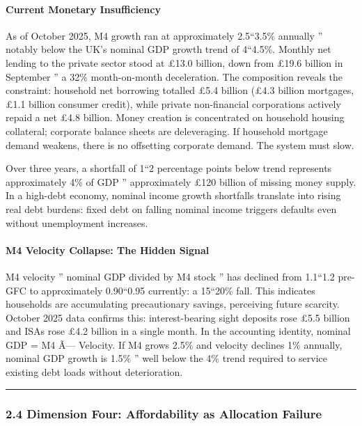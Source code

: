 \documentclass[
]{article}
\begin{document}
\paragraph{Current Monetary
Insufficiency}\label{current-monetary-insufficiency}

As of October 2025, M4 growth ran at approximately 2.5``3.5\% annually
'' notably below the UK's nominal GDP growth trend of 4``4.5\%. Monthly
net lending to the private sector stood at £13.0 billion, down from
£19.6 billion in September '' a 32\% month-on-month deceleration. The
composition reveals the constraint: household net borrowing totalled
£5.4 billion (£4.3 billion mortgages, £1.1 billion consumer credit),
while private non-financial corporations actively repaid a net £4.8
billion. Money creation is concentrated on household housing collateral;
corporate balance sheets are deleveraging. If household mortgage demand
weakens, there is no offsetting corporate demand. The system must slow.

Over three years, a shortfall of 1``2 percentage points below trend
represents approximately 4\% of GDP '' approximately £120 billion of
missing money supply. In a high-debt economy, nominal income growth
shortfalls translate into rising real debt burdens: fixed debt on
falling nominal income triggers defaults even without unemployment
increases.

\paragraph{M4 Velocity Collapse: The Hidden
Signal}\label{m4-velocity-collapse-the-hidden-signal}

M4 velocity '' nominal GDP divided by M4 stock '' has declined from
1.1``1.2 pre-GFC to approximately 0.90``0.95 currently: a 15``20\% fall.
This indicates households are accumulating precautionary savings,
perceiving future scarcity. October 2025 data confirms this:
interest-bearing sight deposits rose £5.5 billion and ISAs rose £4.2
billion in a single month. In the accounting identity, nominal GDP = M4
Ã--- Velocity. If M4 grows 2.5\% and velocity declines 1\% annually,
nominal GDP growth is 1.5\% '' well below the 4\% trend required to
service existing debt loads without deterioration.

\begin{center}\rule{0.5\linewidth}{0.5pt}\end{center}

\subsubsection{2.4 Dimension Four: Affordability as Allocation
Failure}\label{dimension-four-affordability-as-allocation-failure}
\end{document}
